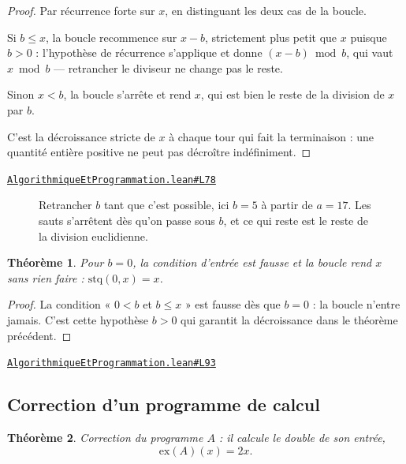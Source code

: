 \documentclass[11pt,a4paper]{article}
\theoremstyle{definition}
\theoremstyle{plain}
\newtheorem{theoreme}{Théorème}
\newcommand{\source}[2]{\par\smallskip\noindent\hfill{\footnotesize\href{#1}{\texttt{#2}}}\par\smallskip}
\begin{document}
\begin{proof}
Par récurrence forte sur $x$, en distinguant les deux cas de la boucle.

Si $b \le x$, la boucle recommence sur $x - b$, strictement plus petit que $x$ puisque
$b > 0$ : l'hypothèse de récurrence s'applique et donne $(x - b) \bmod b$, qui vaut
$x \bmod b$ — retrancher le diviseur ne change pas le reste.

Sinon $x < b$, la boucle s'arrête et rend $x$, qui est bien le reste de la division de
$x$ par $b$.

C'est la décroissance stricte de $x$ à chaque tour qui fait la terminaison : une quantité
entière positive ne peut pas décroître indéfiniment.
\end{proof}
\source{https://github.com/Commutator-IO/learn-lean/blob/main/courses/01-college/07-algorithmique-et-programmation/AlgorithmiqueEtProgrammation.lean\#L78}{AlgorithmiqueEtProgrammation.lean\#L78}

\begin{figure}[h]
\centering

\caption{Retrancher $b$ tant que c'est possible, ici $b = 5$ à partir de $a = 17$. Les sauts s'arrêtent dès qu'on passe sous $b$, et ce qui reste est le reste de la division euclidienne.}
\end{figure}

\begin{theoreme}
Pour $b = 0$, la condition d'entrée est fausse et la boucle rend $x$ sans rien
faire : $\mathrm{stq}(0, x) = x$.
\end{theoreme}

\begin{proof}
La condition « $0 < b$ et $b \le x$ » est fausse dès que $b = 0$ : la boucle n'entre
jamais. C'est cette hypothèse $b > 0$ qui garantit la décroissance dans le théorème
précédent.
\end{proof}
\source{https://github.com/Commutator-IO/learn-lean/blob/main/courses/01-college/07-algorithmique-et-programmation/AlgorithmiqueEtProgrammation.lean\#L93}{AlgorithmiqueEtProgrammation.lean\#L93}

\subsection{Correction d'un programme de calcul}

\begin{theoreme}
Correction du programme $A$ : il calcule le double de son entrée,
\[ \mathrm{ex}(A)(x) = 2x . \]
\end{theoreme}
\end{document}
